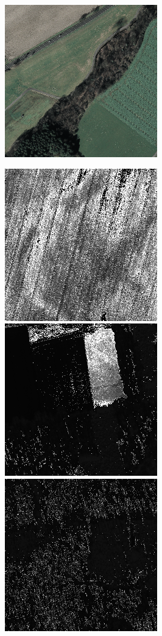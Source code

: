\begin{figure}
    \includegraphics[width=\VegetationIndicesImageWidth]{images/vegetation/original/5}

    \vspace{3mm}
    \includegraphics[width=\VegetationIndicesImageWidth]{images/vegetation/savi/1} \hfill
    \includegraphics[width=\VegetationIndicesImageWidth]{images/vegetation/savi/2} \hfill
    \includegraphics[width=\VegetationIndicesImageWidth]{images/vegetation/savi/3} \hfill

\end{figure}
